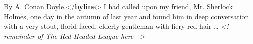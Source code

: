 \begin{shaded}
\hspace*{1em}\hspace*{1em}\hspace*{1em}By A. Conan Doyle.{</\textbf{byline}>}\mbox{}\newline 
\hspace*{1em}\hspace*{1em}\mbox{}\newline 
\hspace*{1em}\hspace*{1em}\mbox{}\newline 
\hspace*{1em}\hspace*{1em}\hspace*{1em}I had called upon my friend, Mr. Sherlock Holmes, one day\mbox{}\newline 
\hspace*{1em}\hspace*{1em}\hspace*{1em}\hspace*{1em}\hspace*{1em}\hspace*{1em}\hspace*{1em}\hspace*{1em} in the autumn of last year and found him in deep conversation\mbox{}\newline 
\hspace*{1em}\hspace*{1em}\hspace*{1em}\hspace*{1em}\hspace*{1em}\hspace*{1em}\hspace*{1em}\hspace*{1em} with a very stout, florid-faced, elderly gentleman with fiery red hair …\mbox{}\newline 
\hspace*{1em}\hspace*{1em}\hspace*{1em}\mbox{}\newline 
\textit{<!-- remainder of The Red Headed League here -->}\mbox{}\newline 

\end{shaded}
